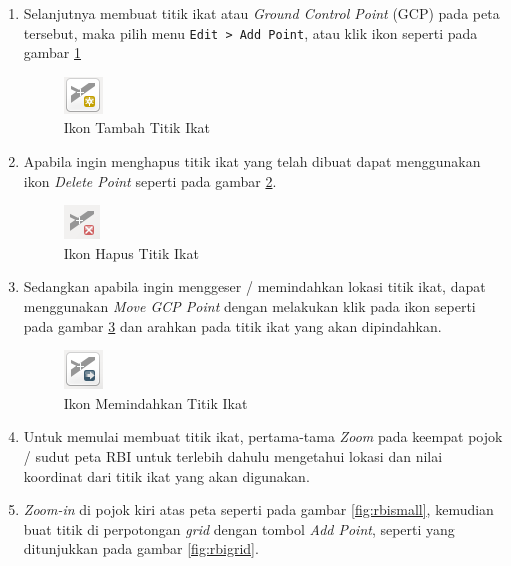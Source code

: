 \begin{enumerate}[1.]
  \item Selanjutnya membuat titik ikat atau \textit{Ground Control Point} (GCP) pada peta tersebut, maka pilih menu \verb|Edit > Add Point|, atau klik ikon seperti pada gambar \ref{fig:addpointicon}
  
  \begin{figure}[H]
    \centering
    \includegraphics[scale=1]{./resources/027-add-point-icon}
    \caption{Ikon Tambah Titik Ikat}
    \label{fig:addpointicon}
  \end{figure}
  
  \item Apabila ingin menghapus titik ikat yang telah dibuat dapat menggunakan ikon \textit{Delete Point} seperti pada gambar \ref{fig:deletepointicon}.
  
  \begin{figure}[H]
    \centering
    \includegraphics[scale=1]{./resources/028-delete-point-icon}
    \caption{Ikon Hapus Titik Ikat}
    \label{fig:deletepointicon}
  \end{figure}
  
  \item Sedangkan apabila ingin menggeser / memindahkan lokasi titik ikat, dapat menggunakan \textit{Move GCP Point} dengan melakukan klik pada ikon seperti pada gambar \ref{fig:movepointicon} dan arahkan pada titik ikat yang akan dipindahkan.
  
  \begin{figure}[H]
    \centering
    \includegraphics[scale=1]{./resources/029-move-point-icon}
    \caption{Ikon Memindahkan Titik Ikat}
    \label{fig:movepointicon}
  \end{figure}
  
  \item Untuk memulai membuat titik ikat, pertama-tama \textit{Zoom} pada keempat pojok / sudut peta RBI untuk terlebih dahulu mengetahui lokasi dan nilai koordinat dari titik ikat yang akan digunakan.
  
  \item \textit{Zoom-in} di pojok kiri atas peta seperti pada gambar \ref{fig:rbismall}, kemudian buat titik di perpotongan \textit{grid} dengan tombol \textit{Add Point}, seperti yang ditunjukkan pada gambar \ref{fig:rbigrid}.
  

\end{enumerate}
